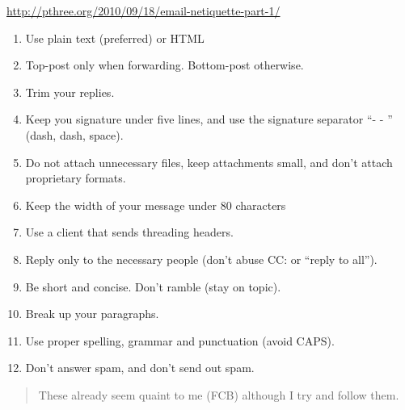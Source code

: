 \documentclass[a4paper,landscape,headrule,footrule,xetex]{foils}
\begin{document}
\url{http://pthree.org/2010/09/18/email-netiquette-part-1/}
\begin{enumerate}
\item Use plain text (preferred) or HTML
\item Top-post only when forwarding. Bottom-post otherwise.
\item Trim your replies.
\item Keep you signature under five lines, and use the signature separator “- -  ” (dash, dash, space).
\item Do not attach unnecessary files, keep attachments small, and don't attach proprietary formats.
\item Keep the width of your message under 80 characters
\item Use a client that sends threading headers.
\item Reply only to the necessary people (don't abuse CC: or “reply to all”).
\item Be short and concise. Don't ramble (stay on topic).
\item Break up your paragraphs.
\item Use proper spelling, grammar and punctuation (avoid CAPS).
\item Don't answer spam, and don't send out spam.
\end{enumerate}

\begin{quote}
  These already seem quaint to me (FCB) although I try and follow them.
\end{quote}
\end{document}
